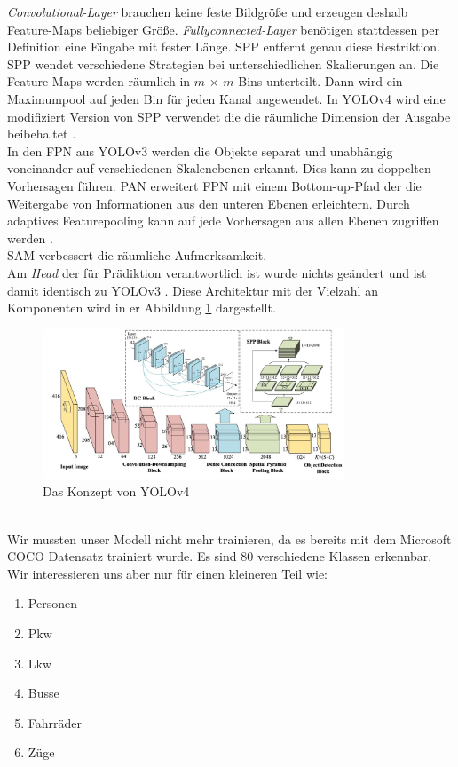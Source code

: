 \documentclass[conference]{IEEEtran}
\begin{document}
	\textit{Convolutional-Layer} brauchen keine feste Bildgröße und erzeugen deshalb  Feature-Maps beliebiger Größe. \textit{Fullyconnected-Layer} benötigen stattdessen per Definition eine Eingabe mit fester Länge. SPP entfernt genau diese Restriktion. SPP wendet verschiedene Strategien bei unterschiedlichen Skalierungen an. Die Feature-Maps werden räumlich in $m$ × $m$ Bins unterteilt. Dann wird ein Maximumpool auf jeden Bin für jeden Kanal angewendet. In YOLOv4 wird eine modifiziert Version von SPP verwendet die die räumliche Dimension der Ausgabe beibehaltet \cite{b9}.\\
	In den FPN aus YOLOv3 werden die Objekte separat und unabhängig voneinander auf verschiedenen Skalenebenen erkannt. Dies kann zu doppelten Vorhersagen führen. PAN erweitert FPN mit einem Bottom-up-Pfad der die Weitergabe von Informationen aus den unteren Ebenen erleichtern. Durch adaptives Featurepooling kann auf jede Vorhersagen aus allen Ebenen zugriffen werden \cite{b10}.\\
	SAM verbessert die räumliche Aufmerksamkeit.\\
	Am \textit{Head} der für Prädiktion verantwortlich ist wurde nichts geändert und  ist damit identisch zu YOLOv3 \cite{b2}\cite{b8}. Diese Architektur mit der Vielzahl an Komponenten wird in er Abbildung \ref{V4Arch} dargestellt.
	\begin{figure}[!h]
		\begin{center}
			\includegraphics[width=9cm]{Media/YoloV4Arch.jpeg}
			\caption{Das Konzept von YOLOv4 \cite{b8}}
			\label{V4Arch}
		\end{center}
	\end{figure}\\
	Wir mussten unser Modell nicht mehr trainieren, da es bereits mit dem Microsoft COCO Datensatz trainiert wurde. Es sind 80 verschiedene Klassen erkennbar. Wir interessieren uns aber nur für einen kleineren Teil wie:
	\begin{enumerate}
		\item Personen
		\item Pkw
		\item Lkw
		\item Busse
		\item Fahrräder
		\item Züge
	\end{enumerate}
\end{document}
